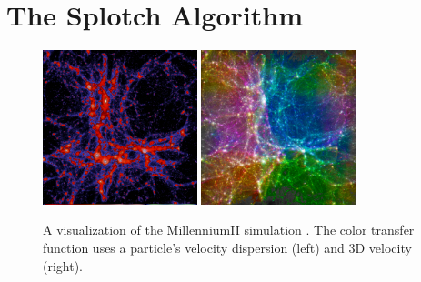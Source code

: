 \documentclass[1p,times]{elsarticle}
\begin{document}


\section{The Splotch Algorithm}
\label{splotch}

\begin{figure}
\begin{center}
\includegraphics[width=0.40\textwidth]{millenium2_veldisp.pdf}
\includegraphics[width=0.40\textwidth]{millenium2_vel.pdf}
\end{center}
\caption{A visualization  of the MillenniumII simulation \citep{2009MNRAS.398.1150B}. The color transfer function uses a particle's velocity dispersion (left) and 3D velocity (right).}\label{mil2}
\end{figure}
\end{document}
